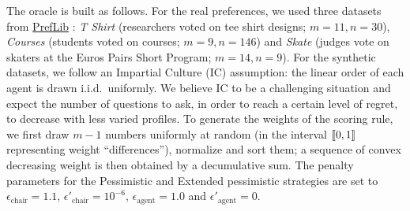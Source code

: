 \documentclass{article}
\begin{document}
The oracle is built as follows. 
For the real preferences, we used three datasets from \href{https://www.preflib.org/}{PrefLib} \citep{PrefLib}: \textit{T Shirt} (researchers voted on tee shirt designs; $m \!=\! 11, n \!=\! 30$),
\textit{Courses}  (students voted on courses; $m \!=\! 9, n \!=\! 146$)
and \emph{Skate} (judges vote on skaters at the Euros Pairs Short Program; $m \!=\! 14, n \!=\! 9$).
For the synthetic datasets, we follow an Impartial Culture (IC) assumption: the linear order of each agent is drawn i.i.d.\ uniformly.
We believe IC to be a challenging situation and expect the number of questions to ask, in order to reach a certain level of regret, to decrease with less varied profiles.
To generate the weights of the scoring rule, we first draw $m \!-\! 1$ numbers uniformly at random (in the interval $\llbracket 0,1 \rrbracket$ representing weight ``differences''), normalize and sort them; a sequence of convex decreasing weight is then obtained by a decumulative sum. The penalty parameters for the Pessimistic and Extended pessimistic strategies are set to  $\epsilon_{\text{chair}} = 1.1$, $\epsilon'_{\text{chair}} = 10^{-6}$, $\epsilon_{\text{agent}} = 1.0$ and $\epsilon'_{\text{agent}} = 0$.
\end{document}
